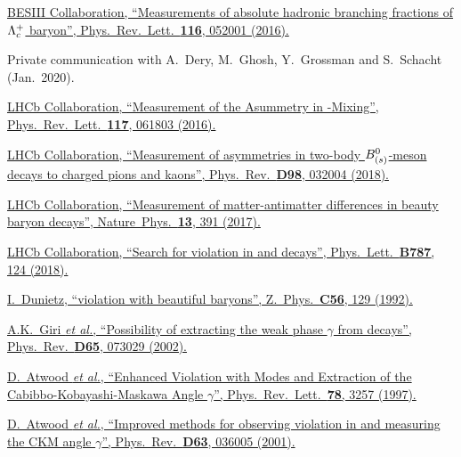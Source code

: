 {\begin{thebibliography}{xxx}
	\href{https://doi.org/10.1103/PhysRevLett.116.052001}{BESIII Collaboration, \enquote{Measurements of absolute hadronic branching fractions of ${\Lambda}^+_{c}$ baryon}, Phys.\ Rev.\ Lett.\ \textbf{116}, 052001 (2016).}

	Private communication with A.~Dery, M.~Ghosh, Y.~Grossman and S.~Schacht (Jan.~2020).

	\href{https://doi.org/10.1103/PhysRevLett.117.061803}{LHCb Collaboration, \enquote{Measurement of the \CP Asummetry in \Bs-\Bsb Mixing}, Phys.\ Rev.\ Lett.\ \textbf{117}, 061803 (2016).}

	\href{https://doi.org/10.1103/PhysRevD.98.032004}{LHCb Collaboration, \enquote{Measurement of \CP asymmetries in two-body $B^0_{({s})}$-meson decays to charged pions and kaons}, Phys.\ Rev.\ \textbf{D98}, 032004 (2018).}

	\href{https://doi.org/10.1038/nphys4021}{LHCb Collaboration, \enquote{Measurement of matter-antimatter differences in beauty baryon decays}, Nature\, Phys.\ \textbf{13}, 391 (2017).}

	\href{https://doi.org/10.1016/j.physletb.2018.10.039}{LHCb Collaboration, \enquote{Search for \CP violation in  and  decays}, Phys.\ Lett.\ \textbf{B787}, 124 (2018).}

	\href{https://doi.org/10.1007/BF01589716}{I.~Dunietz, \enquote{\CP violation with beautiful baryons}, Z.\ Phys.\ \textbf{C56}, 129 (1992).}

	\href{https://doi.org/10.1103/PhysRevD.65.073029}{A.K.~Giri \textit{et al.}, \enquote{Possibility of extracting the weak phase $\gamma$ from \decay{\Lb}{\Lz\Dz} decays}, Phys.\ Rev.\ \textbf{D65}, 073029 (2002).}

	\href{https://doi.org/10.1103/PhysRevLett.78.3257}{D.~Atwood \textit{et al.}, \enquote{Enhanced \CP Violation with \decay{\PB}{\PK\Dz(\Dzb)} Modes and Extraction of the Cabibbo-Kobayashi-Maskawa Angle $\gamma$}, Phys.\ Rev.\ Lett.\ \textbf{78}, 3257 (1997).}

	\href{https://doi.org/10.1103/PhysRevD.63.036005}{D.~Atwood \textit{et al.}, \enquote{Improved methods for observing \CP violation in \decay{\Bpm}{\PK\PD} and measuring the CKM angle $\gamma$}, Phys.\ Rev.\ \textbf{D63}, 036005 (2001).}


\end{thebibliography}}
